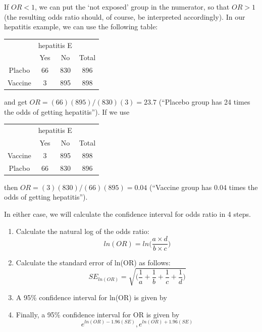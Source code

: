 \documentclass[11pt, chapterprefix=true]{scrbook}\usepackage[]{graphicx}\usepackage[]{color}
\begin{document}
If $OR < 1$, we can put the `not exposed' group in the numerator, so that $OR > 1$  (the resulting odds ratio should, of course, be interpreted accordingly).  In our hepatitis example, we can use the following table:

\begin{table}[ht]
\centering
\begin{tabular}{@{} cccc @{}} \hline
 & \multicolumn{2}{c}{hepatitis E} \\
 & Yes & No & Total \\ \hline
 Placbo  & 66 & 830 & 896 \\
 Vaccine & 3 & 895 & 898 \\
  \hline
 \end{tabular}
 \end{table}

and get $OR = (66)(895)/(830)(3) = 23.7$ (``Placebo group has 24 times the odds of getting hepatitis''). If we use

\begin{table}[ht]
\centering
\begin{tabular}{@{} cccc @{}} \hline
 & \multicolumn{2}{c}{hepatitis E} \\
 & Yes & No & Total \\ \hline
 Vaccine & 3 & 895 & 898 \\
 Placbo  & 66 & 830 & 896 \\
  \hline
 \end{tabular}
 \end{table}

then $OR = (3)(830)/(66)(895) = 0.04$ (``Vaccine group has 0.04 times the odds of getting hepatitis'').

In either case, we will calculate the confidence interval for odds ratio in 4 steps.

\begin{enumerate}
\item Calculate the natural log of the odds ratio:
\begin{equation*}
  ln(OR) = ln \Big( \frac{a \times d}{b \times c} \Big)
\end{equation*}

\item	Calculate the standard error of ln(OR) as follows:
\begin{equation*}
  SE_{ln(OR)} = \sqrt{ \Big( \frac{1}{a} + \frac{1}{b} + \frac{1}{c} + \frac{1}{d} \Big)}
\end{equation*}

\item A 95\% confidence interval for ln(OR) is given by
\begin{equation*}
  [ ln(OR) - 1.96(SE), ln(OR) + 1.96(SE)]
\end{equation*}

\item Finally, a 95\% confidence interval for OR is given by
\begin{equation*}
   e^{ln(OR) - 1.96(SE)}, e^{ln(OR) + 1.96(SE)}
\end{equation*}

\end{enumerate}
\end{document}
